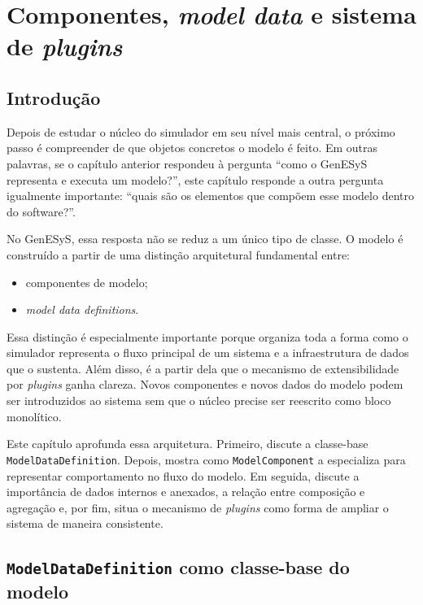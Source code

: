 \chapter{Componentes, \textit{model data} e sistema de \textit{plugins}}
\label{chap:componentes_model_data_plugins}

\section{Introdução}
\label{sec:cap8_introducao}

Depois de estudar o núcleo do simulador em seu nível mais central, o próximo passo é compreender de que objetos concretos o modelo é feito. Em outras palavras, se o capítulo anterior respondeu à pergunta ``como o GenESyS representa e executa um modelo?'', este capítulo responde a outra pergunta igualmente importante: ``quais são os elementos que compõem esse modelo dentro do software?''.

No GenESyS, essa resposta não se reduz a um único tipo de classe. O modelo é construído a partir de uma distinção arquitetural fundamental entre:
\begin{itemize}
    \item componentes de modelo;
    \item \textit{model data definitions}.
\end{itemize}

Essa distinção é especialmente importante porque organiza toda a forma como o simulador representa o fluxo principal de um sistema e a infraestrutura de dados que o sustenta. Além disso, é a partir dela que o mecanismo de extensibilidade por \textit{plugins} ganha clareza. Novos componentes e novos dados do modelo podem ser introduzidos ao sistema sem que o núcleo precise ser reescrito como bloco monolítico.

Este capítulo aprofunda essa arquitetura. Primeiro, discute a classe-base \texttt{ModelDataDefinition}. Depois, mostra como \texttt{ModelComponent} a especializa para representar comportamento no fluxo do modelo. Em seguida, discute a importância de dados internos e anexados, a relação entre composição e agregação e, por fim, situa o mecanismo de \textit{plugins} como forma de ampliar o sistema de maneira consistente.

\section{\texttt{ModelDataDefinition} como classe-base do modelo}
\label{sec:cap8_modeldatadefinition}

